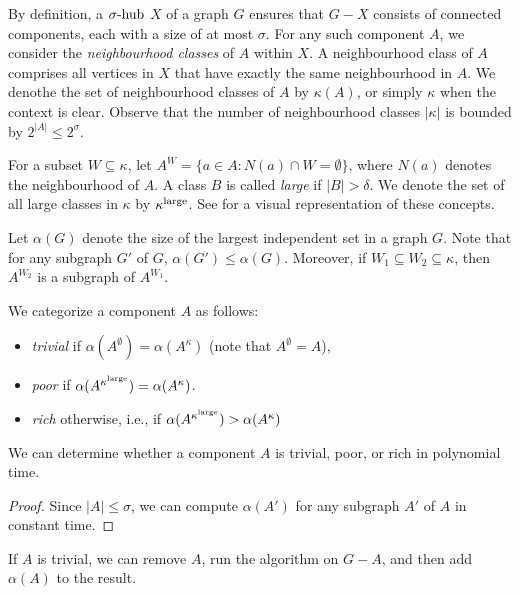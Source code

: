 By definition, a $\sigma\text{-hub}$ $X$ of a graph $G$ ensures that $G - X$ consists of connected components, each with a size of at most $\sigma$. For any such component $A$, we consider the \emph{neighbourhood classes} of $A$ within $X$. A neighbourhood class of $A$ comprises all vertices in $X$ that have exactly the same neighbourhood in $A$. We denothe the set of neighbourhood classes of $A$ by $\kappa(A)$, or simply $\kappa$ when the context is clear. Observe that the number of neighbourhood classes $|\kappa|$ is bounded by $2^{|A|} \leq 2^\sigma$.

\medskip

For a subset $W \subseteq \kappa$, let $A^W = \{a \in A : N(a) \cap W = \emptyset\}$, where $N(a)$ denotes the neighbourhood of $A$. A class $B$ is called \emph{large} if $|B| > \delta$. We denote the set of all large classes in $\kappa$ by $\kappa^\text{large}$. See  for a visual representation of these concepts.



\medskip

Let $\alpha(G)$ denote the size of the largest independent set in a graph $G$. Note that for any subgraph $G'$ of $G$, $\alpha(G') \leq \alpha(G)$. Moreover, if $W_1 \subseteq W_2 \subseteq \kappa$, then $A^{W_2}$ is a subgraph of $A^{W_1}$.

\medskip

We categorize a component $A$ as follows:
\begin{itemize}
    \item \emph{trivial} if $\alpha(A^\emptyset) = \alpha(A^\kappa)$ (note that $A^\emptyset = A$),
    \item \emph{poor} if $\alpha(A^{\kappa^\text{large}}) = \alpha(A^\kappa)$.
    \item \emph{rich} otherwise, i.e., if $\alpha(A^{\kappa^\text{large}}) > \alpha(A^\kappa)$
\end{itemize}

\begin{observation}
    We can determine whether a component $A$ is trivial, poor, or rich in polynomial time.
\end{observation}

\begin{proof}
    Since $|A| \leq \sigma$, we can compute $\alpha(A')$ for any subgraph $A'$ of $A$ in constant time. 
\end{proof}

\begin{observation}
    If $A$ is trivial, we can remove $A$, run the algorithm on $G - A$, and then add $\alpha(A)$ to the result.
\end{observation}

